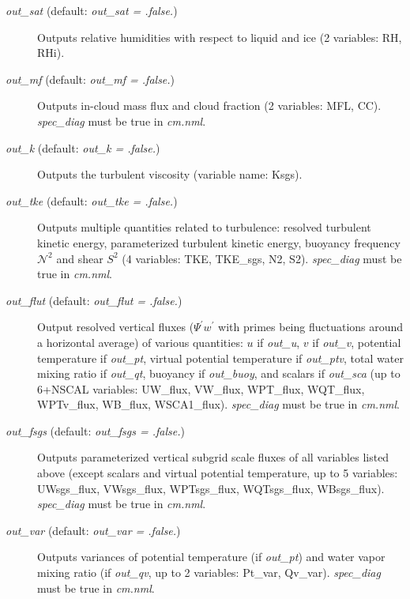 \documentclass[12pt,A4,french]{article}
\begin{document}
\begin{description}
\item[{\it out\_sat} (default: {\it out\_sat = .false.})]

Outputs relative humidities with respect to liquid and ice (2 variables: RH, RHi). 

\item[{\it out\_mf} (default: {\it out\_mf = .false.})]

Outputs in-cloud mass flux and cloud fraction (2 variables: MFL, CC). {\it spec\_diag} must be true in {\it cm.nml}.

\item[{\it out\_k} (default: {\it out\_k = .false.})]

Outputs the turbulent viscosity (variable name: Ksgs).

\item[{\it out\_tke} (default: {\it out\_tke = .false.})]

Outputs multiple quantities related to turbulence: resolved turbulent kinetic energy, parameterized turbulent kinetic energy, buoyancy frequency $\mathcal{N}^2$ and shear $S^2$ (4 variables: TKE, TKE\_sgs, N2, S2). {\it spec\_diag} must be true in {\it cm.nml}. 

\item[{\it out\_flut} (default: {\it out\_flut = .false.})]

Output resolved vertical fluxes ($\Psi^{\prime} w^{\prime}$ with primes being fluctuations around a horizontal average) of various quantities: $u$ if {\it out\_u}, $v$ if {\it out\_v}, potential temperature if {\it out\_pt}, virtual potential temperature if {\it out\_ptv}, total water mixing ratio if {\it out\_qt}, buoyancy if {\it out\_buoy}, and scalars if {\it out\_sca} (up to 6+NSCAL variables: UW\_flux, VW\_flux, WPT\_flux, WQT\_flux, WPTv\_flux, WB\_flux, WSCA1\_flux). {\it spec\_diag} must be true in {\it cm.nml}. 

\item[{\it out\_fsgs} (default: {\it out\_fsgs = .false.})]

Outputs parameterized vertical subgrid scale fluxes of all variables listed above (except scalars and virtual potential temperature, up to 5 variables: UWsgs\_flux, VWsgs\_flux, WPTsgs\_flux, WQTsgs\_flux, WBsgs\_flux). {\it spec\_diag} must be true in {\it cm.nml}.

\item[{\it out\_var} (default: {\it out\_var = .false.})]

Outputs variances of potential temperature (if {\it out\_pt}) and water vapor mixing ratio (if {\it out\_qv}, up to 2 variables: Pt\_var, Qv\_var). {\it spec\_diag} must be true in {\it cm.nml}.


\end{description}
\end{document}
